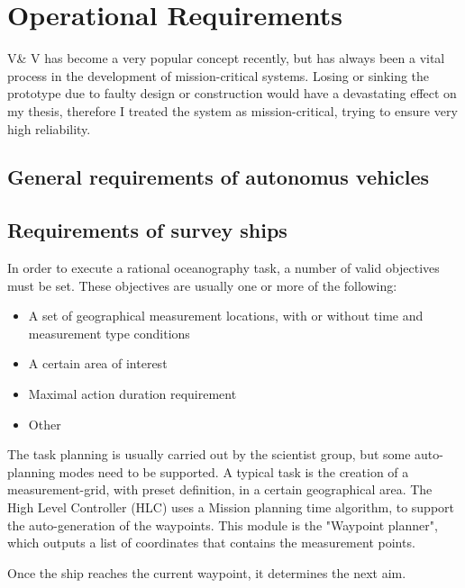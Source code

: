 \section{Operational Requirements}

V\& V has become a very popular concept recently, but has always been a vital process in the development of mission-critical systems. Losing or sinking the prototype due to faulty design or construction would have a devastating effect on my thesis, therefore I treated the system as mission-critical, trying to ensure very high reliability.

\subsection{General requirements of autonomus vehicles}

\subsection{Requirements of survey ships}

In order to execute a rational oceanography task, a number of valid objectives must be set. These objectives are usually one or more of the following\cite{oceanography}:

\begin{itemize}
\item A set of geographical measurement locations, with or without time and measurement type conditions
\item A certain area of interest
\item Maximal action duration requirement
\item Other
\end{itemize}

The task planning is usually carried out by the scientist group, but some auto-planning modes need to be supported. A typical task is the creation of a measurement-grid, with preset definition, in a certain geographical area. The High Level Controller (HLC) uses a Mission planning time algorithm, to support the auto-generation of the waypoints. This module is the "Waypoint planner", which outputs a list of coordinates that contains the measurement points.

Once the ship reaches the current waypoint, it determines the next aim.

